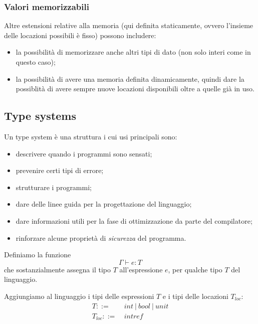 \documentclass[a4paper, 11pt]{article}
\begin{document}
\subsubsection{Valori memorizzabili}
Altre estensioni relative alla memoria (qui definita staticamente, ovvero l'insieme delle locazioni possibili è fisso) possono includere: \begin{itemize}
	\item la possibilità di memorizzare anche altri tipi di dato (non solo interi come in questo caso);
	\item la possibilità di avere una memoria definita dinamicamente, quindi dare la possiblità di avere sempre nuove locazioni disponibili oltre a quelle già in uso.
\end{itemize}

\subsection{Type systems}
Un type system è una struttura i cui usi principali sono: \begin{itemize}
	\item descrivere quando i programmi sono sensati;
	\item prevenire certi tipi di errore;
	\item strutturare i programmi;
	\item dare delle linee guida per la progettazione del linguaggio;
	\item dare informazioni utili per la fase di ottimizzazione da parte del compilatore;
	\item rinforzare alcune proprietà di \emph{sicurezza} del programma.
\end{itemize}

Definiamo la funzione \[ \Gamma \vdash e : T \]
che sostanzialmente assegna il tipo $T$ all'espressione $e$, per qualche tipo $T$ del linguaggio.

Aggiungiamo al linguaggio i tipi delle espressioni $T$ e i tipi delle locazioni $T_{loc}$:
\begin{align*}
	T ::=\ & int\ \vert\ bool\ \vert\ unit \\
	T_{loc} ::=\ & intref
\end{align*}
\end{document}
